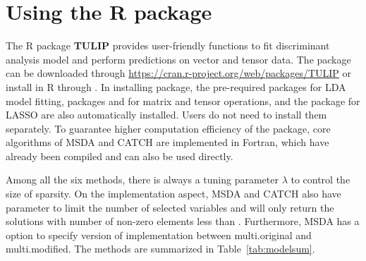 \section{Using the R package}\label{sec: usage}


The R package \textbf{TULIP} provides user-friendly functions to fit discriminant analysis model and perform predictions on vector and tensor data. The package can be downloaded through \url{https://cran.r-project.org/web/packages/TULIP} or install in R through . In installing package, the pre-required packages \citep{MASS} for LDA model fitting, packages  \citep{Matrix} and  \citep{tensr} for matrix and tensor operations, and the package \citep{glmnet} for LASSO are also automatically installed. Users do not need to install them separately. To guarantee higher computation efficiency of the package, core algorithms of MSDA and CATCH are implemented in Fortran, which have already been compiled and can also be used directly.

Among all the six methods, there is always a tuning parameter $\lambda$ to control the size of sparsity. On the implementation aspect, MSDA and CATCH also have parameter  to limit the number of selected variables and will only return the solutions with number of non-zero elements less than . Furthermore, MSDA has a  option to specify version of implementation between multi.original and multi.modified. The methods are summarized in Table~\ref{tab:modelsum}.

\begin{table}[!t]
 \centering
 \caption{Method description and major parameters. Penalty parameter $\lambda$ controls the size of $\ell_1$-penalty. Parameter  limits the maximum number of non-zero variables. Parameter  specifies the version of implementation for MSDA.}
 \label{tab:modelsum}
\end{table}

